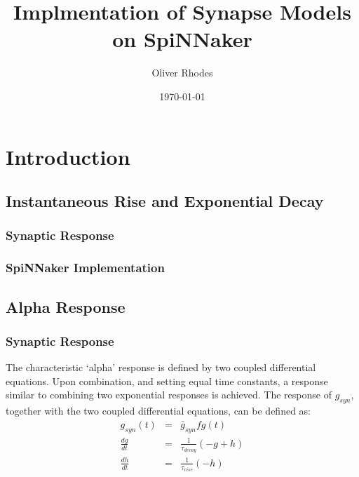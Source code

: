 \documentclass[12pt]{article}
\title{Implmentation of Synapse Models on SpiNNaker}
\author{Oliver Rhodes}
\date{\today}
\begin{document}
\maketitle

\section{Introduction}


\subsection{Instantaneous Rise and Exponential Decay}
\subsubsection*{Synaptic Response}


\subsubsection*{SpiNNaker Implementation}

\subsection{Alpha Response}
\subsubsection*{Synaptic Response}
The characteristic `alpha' response is defined by two coupled differential equations. Upon combination, and setting equal time constants, a response similar to combining two exponential responses is achieved. The response of $g_{syn}$, together with the two coupled differential equations, can be defined as:
\begin{eqnarray}
g_{syn}(t) & = & \bar{g}_{syn}fg(t) \nonumber \\
\frac{dg}{dt} & = & \frac{1}{\tau_{decay}} (-g + h) \nonumber \\
\frac{dh}{dt} & = & \frac{1}{\tau_{rise}}(-h) \nonumber
\label{eqn:alpha_coupled_diff_eqns}
\end{eqnarray}
\end{document}
